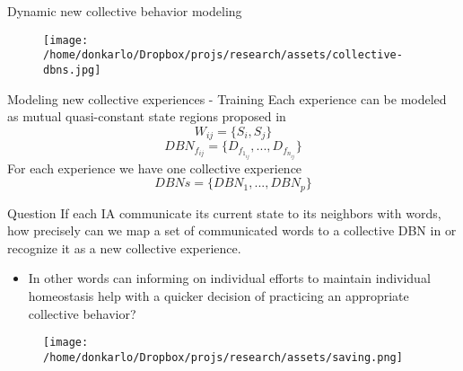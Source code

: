 \documentclass[unknownkeysallowed]{beamer}
\begin{document}
	\begin{frame}{Dynamic new collective behavior modeling}  
		\begin{figure}
			\texttt{[image: /home/donkarlo/Dropbox/projs/research/assets/collective-dbns.jpg]}
			\caption{}
		\end{figure}
	\end{frame}

	\begin{frame}{Modeling new collective experiences - Training}
		Each experience can be modeled as mutual quasi-constant state regions proposed in \cite{baydoun-2019-prediction-of-multi-target-dynamics-using-discrete-descriptors-an-interactive-approach} 
		\begin{equation}
		W_{ij} = \{S_i,S_j\}
		\end{equation}
		\begin{equation}
		DBN_{f_{ij}} = \{D_{f_{1_{ij}}},...,D_{f_{n_{ij}}}\}
		\end{equation}
		For each experience we have one collective experience
		\begin{equation}
		DBNs = \{DBN_1,...,DBN_p\}
		\end{equation}
	\end{frame}

	\begin{frame}{Question}
		If each IA communicate its current state to its neighbors with \cite{kanapram-2020-collective-awareness-for-abnormality-detection-in-connected-autonomous-vehicles} words, how precisely can we map a set of communicated words to a collective DBN in \cite{baydoun-2019-prediction-of-multi-target-dynamics-using-discrete-descriptors-an-interactive-approach} or recognize it as a new collective experience. 
		\begin{itemize}
			\item In other words can informing on individual efforts to maintain individual homeostasis help with a quicker decision of practicing an appropriate collective behavior?
		\end{itemize}
		\begin{figure}
			\texttt{[image: /home/donkarlo/Dropbox/projs/research/assets/saving.png]}
			\caption{}
		\end{figure}
	\end{frame}
\end{document}
